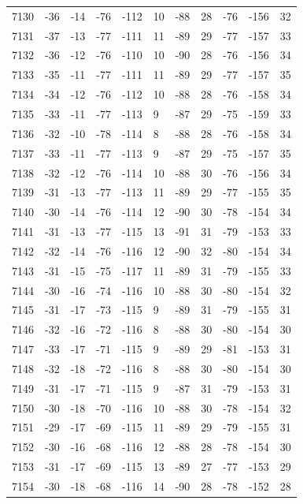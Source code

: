 \begin{table}[H]
\begin{tabular}{lllllllllll}
7130 & -36 & -14 & -76 & -112 & 10 & -88 & 28 & -76 & -156 & 32 \\
7131 & -37 & -13 & -77 & -111 & 11 & -89 & 29 & -77 & -157 & 33 \\
7132 & -36 & -12 & -76 & -110 & 10 & -90 & 28 & -76 & -156 & 34 \\
7133 & -35 & -11 & -77 & -111 & 11 & -89 & 29 & -77 & -157 & 35 \\
7134 & -34 & -12 & -76 & -112 & 10 & -88 & 28 & -76 & -158 & 34 \\
7135 & -33 & -11 & -77 & -113 & 9 & -87 & 29 & -75 & -159 & 33 \\
7136 & -32 & -10 & -78 & -114 & 8 & -88 & 28 & -76 & -158 & 34 \\
7137 & -33 & -11 & -77 & -113 & 9 & -87 & 29 & -75 & -157 & 35 \\
7138 & -32 & -12 & -76 & -114 & 10 & -88 & 30 & -76 & -156 & 34 \\
7139 & -31 & -13 & -77 & -113 & 11 & -89 & 29 & -77 & -155 & 35 \\
7140 & -30 & -14 & -76 & -114 & 12 & -90 & 30 & -78 & -154 & 34 \\
7141 & -31 & -13 & -77 & -115 & 13 & -91 & 31 & -79 & -153 & 33 \\
7142 & -32 & -14 & -76 & -116 & 12 & -90 & 32 & -80 & -154 & 34 \\
7143 & -31 & -15 & -75 & -117 & 11 & -89 & 31 & -79 & -155 & 33 \\
7144 & -30 & -16 & -74 & -116 & 10 & -88 & 30 & -80 & -154 & 32 \\
7145 & -31 & -17 & -73 & -115 & 9 & -89 & 31 & -79 & -155 & 31 \\
7146 & -32 & -16 & -72 & -116 & 8 & -88 & 30 & -80 & -154 & 30 \\
7147 & -33 & -17 & -71 & -115 & 9 & -89 & 29 & -81 & -153 & 31 \\
7148 & -32 & -18 & -72 & -116 & 8 & -88 & 30 & -80 & -154 & 30 \\
7149 & -31 & -17 & -71 & -115 & 9 & -87 & 31 & -79 & -153 & 31 \\
7150 & -30 & -18 & -70 & -116 & 10 & -88 & 30 & -78 & -154 & 32 \\
7151 & -29 & -17 & -69 & -115 & 11 & -89 & 29 & -79 & -155 & 31 \\
7152 & -30 & -16 & -68 & -116 & 12 & -88 & 28 & -78 & -154 & 30 \\
7153 & -31 & -17 & -69 & -115 & 13 & -89 & 27 & -77 & -153 & 29 \\
7154 & -30 & -18 & -68 & -116 & 14 & -90 & 28 & -78 & -152 & 28 \\

\end{tabular}
\end{table}
